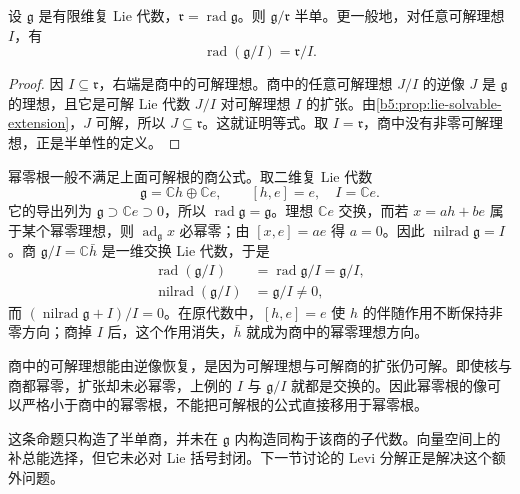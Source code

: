 \begin{proposition}\label{b5:prop:radical-quotient-semisimple}
	设 \(\mathfrak g\) 是有限维复 Lie 代数，\(\mathfrak r=\operatorname{rad}\mathfrak g\)。则 \(\mathfrak g/\mathfrak r\) 半单。更一般地，对任意可解理想 \(I\)，有
	\[
		\operatorname{rad}(\mathfrak g/I)=\mathfrak r/I.
	\]
\end{proposition}
\begin{proof}
	因 \(I\subseteq\mathfrak r\)，右端是商中的可解理想。商中的任意可解理想 \(J/I\) 的逆像 \(J\) 是 \(\mathfrak g\) 的理想，且它是可解 Lie 代数 \(J/I\) 对可解理想 \(I\) 的扩张。由\cref{b5:prop:lie-solvable-extension}，\(J\) 可解，所以 \(J\subseteq\mathfrak r\)。这就证明等式。取 \(I=\mathfrak r\)，商中没有非零可解理想，正是半单性的定义。
\end{proof}

\begin{example}\label{b5:exm:nilradical-quotient-failure}
	幂零根一般不满足上面可解根的商公式。取二维复 Lie 代数
	\[
		\mathfrak g=\mathbb Ch\oplus\mathbb Ce,\qquad[h,e]=e, \quad I=\mathbb Ce.
	\]
	它的导出列为 \(\mathfrak g\supset\mathbb Ce\supset0\)，所以 \(\operatorname{rad}\mathfrak g=\mathfrak g\)。理想 \(\mathbb Ce\) 交换，而若 \(x=ah+be\) 属于某个幂零理想，则 \(\operatorname{ad}_{\mathfrak g}x\) 必幂零；由 \([x,e]=ae\) 得 \(a=0\)。因此 \(\operatorname{nilrad}\mathfrak g=I\)。商 \(\mathfrak g/I=\mathbb C\bar h\) 是一维交换 Lie 代数，于是
	\[
		\begin{aligned}
			\operatorname{rad}(\mathfrak g/I) &=\operatorname{rad}\mathfrak g/I=\mathfrak g/I,\\
			\operatorname{nilrad}(\mathfrak g/I)&=\mathfrak g/I\ne0,
		\end{aligned}
	\]
	而 \((\operatorname{nilrad}\mathfrak g+I)/I=0\)。在原代数中，\([h,e]=e\) 使 \(h\) 的伴随作用不断保持非零方向；商掉 \(I\) 后，这个作用消失，\(\bar h\) 就成为商中的幂零理想方向。
\end{example}

商中的可解理想能由逆像恢复，是因为可解理想与可解商的扩张仍可解。即使核与商都幂零，扩张却未必幂零，上例的 \(I\) 与 \(\mathfrak g/I\) 就都是交换的。因此幂零根的像可以严格小于商中的幂零根，不能把可解根的公式直接移用于幂零根。

\ProseParagraphBreak

这条命题只构造了半单商，并未在 \(\mathfrak g\) 内构造同构于该商的子代数。向量空间上的补总能选择，但它未必对 Lie 括号封闭。下一节讨论的 Levi 分解正是解决这个额外问题。
